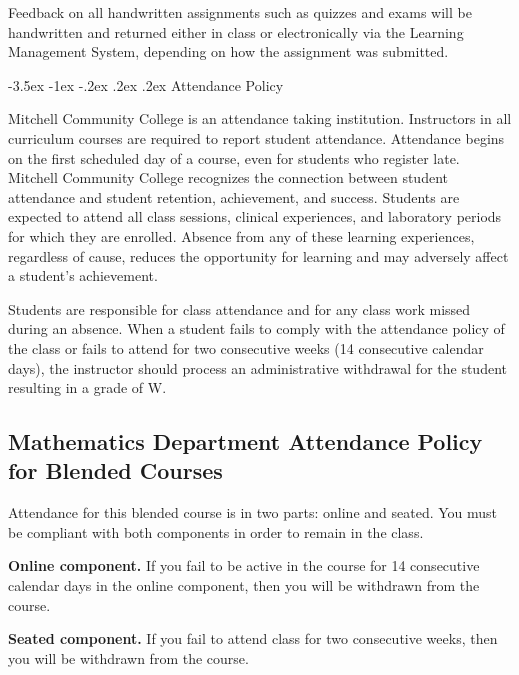 \documentclass[11pt]{article}
\makeatletter
\renewcommand\section{\@startsection{section}{1}{0pt}%
  {-3.5ex \@plus -1ex \@minus -.2ex}%
  {.2ex \@plus.2ex}%
  {\normalfont\Large\bfseries}} %
\makeatother
\begin{document}
Feedback on all handwritten assignments such as quizzes and exams will be handwritten and returned either in class or electronically via the Learning Management System, depending on how the assignment was submitted.

\section{Attendance Policy}

Mitchell Community College is an attendance taking institution. Instructors in all curriculum courses are required to report student attendance. Attendance begins on the first scheduled day of a course, even for students who register late. Mitchell Community College recognizes the connection between student attendance and student retention, achievement, and success. Students are expected to attend all class sessions, clinical experiences, and laboratory periods for which they are enrolled. Absence from any of these learning experiences, regardless of cause, reduces the opportunity for learning and may adversely affect a student's achievement.

Students are responsible for class attendance and for any class work missed during an absence. When a student fails to comply with the attendance policy of the class or fails to attend for two consecutive weeks (14 consecutive calendar days), the instructor should process an administrative withdrawal for the student resulting in a grade of W.

\subsection{Mathematics Department Attendance Policy for Blended Courses}

Attendance for this blended course is in two parts: online and seated.  You must be compliant with both components in order to remain in the class.

\textbf{Online component.} If you fail to be active in the course for 14 consecutive calendar days in the online component, then you will be withdrawn from the course.

\textbf{Seated component.} If you fail to attend class for two consecutive weeks, then you will be withdrawn from the course.
\end{document}
